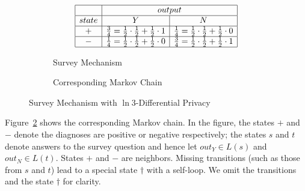 \begin{figure}
  \centering
  \begin{subfigure}{.48\columnwidth}
      \[
      \begin{array}{|c|c|c|}
        \hline
        &
        \multicolumn{2}{c|}{output}
        \\
        \hline
        state & Y & N \\
        \hline
        + & \frac{3}{4} = \frac{1}{2} \cdot \frac{1}{2} + \frac{1}{2} \cdot 1
          & \frac{1}{4} = \frac{1}{2} \cdot \frac{1}{2} + \frac{1}{2} \cdot 0
        \\
        \hline
        - & \frac{1}{4} = \frac{1}{2} \cdot \frac{1}{2} + \frac{1}{2} \cdot 0
          & \frac{3}{4} = \frac{1}{2} \cdot \frac{1}{2} + \frac{1}{2} \cdot 1
        \\
        \hline
      \end{array}
      \]
    \caption{Survey Mechanism}
    \label{figure:2-dp-table}
  \end{subfigure}
  \hspace{.05\columnwidth}
  \begin{subfigure}{.40\columnwidth}
    \caption{Corresponding Markov Chain}
    \label{figure:2-dp-mdp}
  \end{subfigure}
  \caption{Survey Mechanism with $\ln 3$-Differential Privacy}
  \label{figure:2-dp}
\end{figure}

Figure~\ref{figure:2-dp-mdp} shows the corresponding Markov chain.
In the figure, the states
$+$ and $-$ denote the diagnoses are positive or negative
respectively; the states $s$ and $t$ denote answers to the survey
question and hence let $\mathit{out}_Y \in L (s)$ and $\mathit{out}_N
\in L (t)$.
States $+$ and $-$ are neighbors.
Missing transitions (such as those from $s$ and $t$) lead
to a special state $\dagger$ with a self-loop. We omit the transitions
and the state $\dagger$ for clarity.


